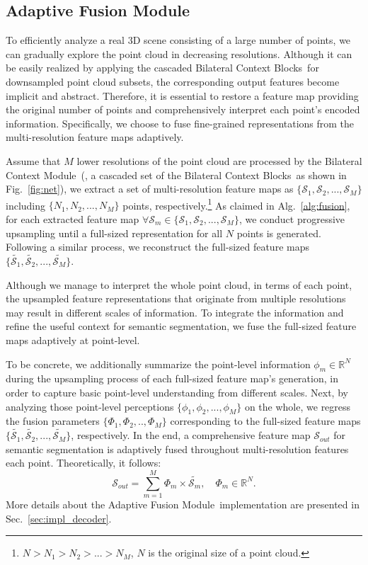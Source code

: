 \documentclass[10pt,twocolumn,letterpaper]{article}
\def\ourencoder{Bilateral Context Module}
\def\ourblocks{Bilateral Context Blocks}
\def\ourdecoder{Adaptive Fusion Module}
\begin{document}
\subsection{Adaptive Fusion Module}
\label{sec:metho_fuse}
To efficiently analyze a real 3D scene consisting of a large number of points, we can gradually explore the point cloud in decreasing resolutions. Although it can be easily realized by applying the cascaded \ourblocks~for downsampled point cloud subsets, the corresponding output features become implicit and abstract. Therefore, it is essential to restore a feature map providing the original number of points and comprehensively interpret each point's encoded information. Specifically, we choose to fuse fine-grained representations from the multi-resolution feature maps adaptively.

Assume that $M$ lower resolutions of the point cloud are processed by the \ourencoder~(\ie, a cascaded set of the \ourblocks~as shown in Fig.~\ref{fig:net}), we extract a set of multi-resolution feature maps as $\{\mathcal{S}_1, \mathcal{S}_2, ..., \mathcal{S}_M\}$ including $\{N_1, N_2, ..., N_M\}$ points, respectively.\footnote{$N>N_1>N_2>...>N_M$, $N$ is the original size of a point cloud.} As claimed in Alg.~\ref{alg:fusion}, for each extracted feature map ${\forall}\mathcal{S}_m\in \{\mathcal{S}_1, \mathcal{S}_2, ..., \mathcal{S}_M\}$, we conduct progressive upsampling until a full-sized representation for all $N$ points is generated. Following a similar process, we reconstruct the full-sized feature maps $\{\tilde{\mathcal{S}_1}, \tilde{\mathcal{S}_2}, ..., \tilde{\mathcal{S}_M}\}$.

Although we manage to interpret the whole point cloud, in terms of each point, the upsampled feature representations that originate from multiple resolutions may result in different scales of information. To integrate the information and refine the useful context for semantic segmentation, we fuse the full-sized feature maps adaptively at point-level.

To be concrete, we additionally summarize the point-level information $\phi_m \in\mathbb{R}^{N}$ during the upsampling process of each full-sized feature map's generation, in order to capture basic point-level understanding from different scales. Next, by analyzing those point-level perceptions $\{\phi_1, \phi_2, ..., \phi_M\}$ on the whole, we regress the fusion parameters $\{\Phi_1,\Phi_2,..,\Phi_M\}$ corresponding to the full-sized feature maps $\{\tilde{\mathcal{S}_1}, \tilde{\mathcal{S}_2}, ..., \tilde{\mathcal{S}_M}\}$, respectively. In the end, a comprehensive feature map $\mathcal{S}_{out}$ for semantic segmentation is adaptively fused throughout multi-resolution features \wrt each point. Theoretically, it follows:
\begin{equation}
\label{eq:fusion}
    {\mathcal{S}_{out}} = \sum_{m=1}^{M}{\Phi_m \times \tilde{\mathcal{S}_m}}, \quad \Phi_m \in\mathbb{R}^{N}.
\end{equation}
More details about the \ourdecoder~implementation are presented in Sec.~\ref{sec:impl_decoder}. 
\end{document}
